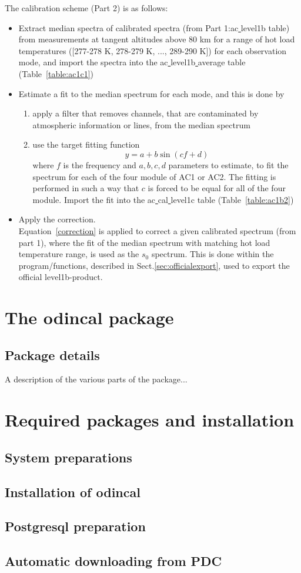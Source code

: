 \documentclass[12pt]{article}
\begin{document}
The calibration scheme (Part 2) is as follows:
\begin{itemize}
\item Extract median spectra of calibrated spectra 
(from Part 1:ac\underline{ }level1b table) 
from measurements at tangent altitudes above 80 km for a range of hot load 
temperatures ([277-278 K, 278-279 K, ..., 289-290 K]) 
for each observation mode, and import the spectra
into the ac\underline{ }level1b\underline{ }average table
(Table~\ref{table:ac1c1})
\item Estimate a fit to the median spectrum for each mode, and this is done
by
\begin{enumerate}
\item apply a filter that removes channels, that are contaminated by 
atmospheric information or lines, from the median spectrum 
\item use the target fitting function  
\begin{equation}
y=a+ b\sin(cf+d)
\end{equation}
where \(f\) is the frequency and \(a,b,c,d\) parameters to estimate,
to fit the spectrum for each of the four module of AC1 or AC2.
The fitting is performed in such a way that \(c\) is forced 
to be equal for all of the four module. 
Import the fit into the ac\underline{ }cal\underline{ }level1c
table (Table~\ref{table:ac1b2})
\end{enumerate}
\item Apply the correction.\\
Equation~\ref{correction} is applied to correct a given calibrated 
spectrum (from part 1), where the fit of the median spectrum
with matching hot load temperature range, is used as the \(s_{0}\)
spectrum. 
This is done within the program/functions, described in
Sect.\ref{sec:officialexport}, used to export the official
level1b-product.  
\end{itemize}

      
  



 



\section{The odincal package}
\subsection{Package details}
A description of the various parts of the package...

\section{Required packages and installation}
\subsection{System preparations}
\subsection{Installation of odincal}
\subsection{Postgresql preparation}
\subsection{Automatic downloading from PDC}
\end{document}
